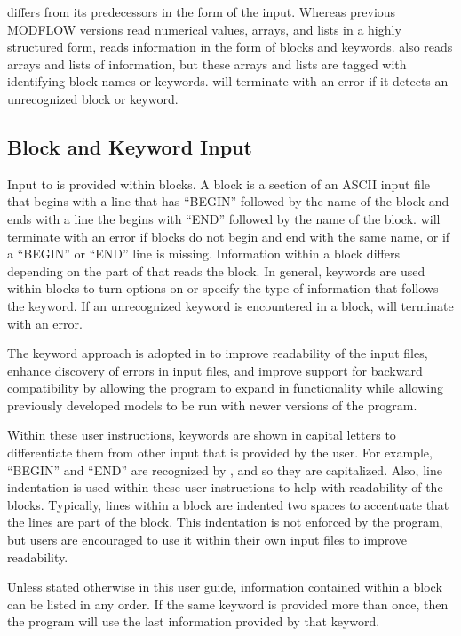 \mf differs from its predecessors in the form of the input.  Whereas previous MODFLOW versions read numerical values, arrays, and lists in a highly structured form, \mf reads information in the form of blocks and keywords.  \mf also reads arrays and lists of information, but these arrays and lists are tagged with identifying block names or keywords.  \mf will terminate with an error if it detects an unrecognized block or keyword.

\subsection{Block and Keyword Input} 

Input to \mf is provided within blocks.  A block is a section of an ASCII input file that begins with a line that has ``BEGIN'' followed by the name of the block and ends with a line the begins with ``END'' followed by the name of the block.  \mf will terminate with an error if blocks do not begin and end with the same name, or if a ``BEGIN'' or ``END'' line is missing.  Information within a block differs depending on the part of \mf that reads the block.  In general, keywords are used within blocks to turn options on or specify the type of information that follows the keyword.  If an unrecognized keyword is encountered in a block, \mf will terminate with an error.

The keyword approach is adopted in \mf to improve readability of the \mf input files, enhance discovery of errors in input files, and improve support for backward compatibility by allowing the program to expand in functionality while allowing previously developed models to be run with newer versions of the program.

Within these user instructions, keywords are shown in capital letters to differentiate them from other input that is provided by the user.  For example, ``BEGIN'' and ``END'' are recognized by \mf, and so they are capitalized.  Also, line indentation is used within these user instructions to help with readability of the blocks.  Typically, lines within a block are indented two spaces to accentuate that the lines are part of the block.  This indentation is not enforced by the program, but users are encouraged to use it within their own input files to improve readability.

Unless stated otherwise in this user guide, information contained within a block can be listed in any order.  If the same keyword is provided more than once, then the program will use the last information provided by that keyword.


